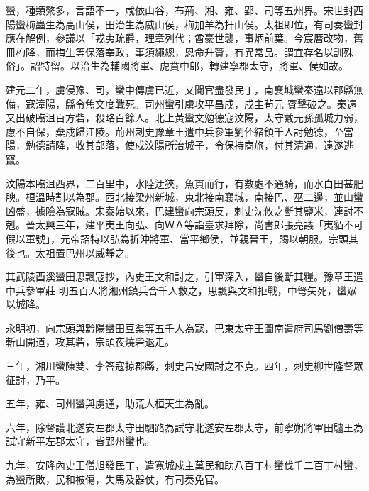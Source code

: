 
\begin{pinyinscope}

 蠻，種類繁多，言語不一，咸依山谷，布荊、湘、雍、郢、司等五州界。宋世封西陽蠻梅蟲生為高山侯，田治生為威山侯，梅加羊為扞山侯。太祖即位，有司奏蠻封應在解例，參議以「戎夷疏爵，理章列代；酋豪世襲，事炳前葉。今宸曆改物，舊冊杓降，而梅生等保落奉政，事須繩總，恩命升贊，有異常品。謂宜存名以訓殊俗」。詔特留。以治生為輔國將軍、虎賁中郎，轉建寧郡太守，將軍、侯如故。



 建元二年，虜侵豫、司，蠻中傳虜已近，又聞官盡發民丁，南襄城蠻秦遠以郡縣無備，寇潼陽，縣令焦文度戰死。司州蠻引虜攻平昌戍，戍主茍元
 賓擊破之。秦遠又出破臨沮百方砦，殺略百餘人。北上黃蠻文勉德寇汶陽，太守戴元孫孤城力弱，慮不自保，棄戍歸江陵。荊州刺史豫章王遣中兵參軍劉伾緒領千人討勉德，至當陽，勉德請降，收其部落，使戍汶陽所治城子，令保持商旅，付其清通，遠遂逃竄。



 汶陽本臨沮西界，二百里中，水陸迂狹，魚貫而行，有數處不通騎，而水白田甚肥腴。桓溫時割以為郡。西北接梁州新城，東北接南襄城，南接巴、巫二邊，並山蠻凶盛，據險為寇賊。宋泰始以來，巴建蠻向宗頭反，刺史沈攸之斷其鹽米，連討不剋。晉太興三年，建平夷王向弘、向ＷＡ等詣臺求拜除，尚書郎張亮議「夷貊不可假以軍號」，元帝詔特以弘為折沖將軍、當平鄉侯，並親晉王，賜以朝服。宗頭其後也。太祖置巴州以威靜之。



 其武陵酉溪蠻田思飄寇抄，內史王文和討之，引軍深入，蠻自後斷其糧。豫章王遣中兵參軍莊
 明五百人將湘州鎮兵合千人救之，思飄與文和拒戰，中弩矢死，蠻眾以城降。



 永明初，向宗頭與黔陽蠻田豆渠等五千人為寇，巴東太守王圖南遣府司馬劉僧壽等斬山開道，攻其砦，宗頭夜燒砦退走。



 三年，湘川蠻陳雙、李答寇掠郡縣，刺史呂安國討之不克。四年，刺史柳世隆督眾征討，乃平。



 五年，雍、司州蠻與虜通，助荒人桓天生為亂。



 六年，除督護北遂安左郡太守田駟路為試守北遂安左郡太守，前寧朔將軍田驢王為試守新平左郡太守，皆郢州蠻也。



 九年，安隆內史王僧旭發民丁，遣寬城戍主萬民和助八百丁村蠻伐千二百丁村蠻，為蠻所敗，民和被傷，失馬及器仗，有司奏免官。




\end{pinyinscope}
